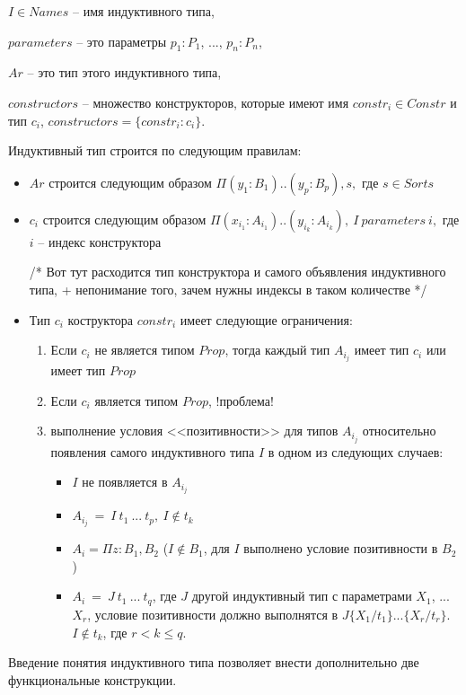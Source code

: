 \documentclass[12pt]{article}
\begin{document}
$I \in Names$ -- имя индуктивного типа,

$parameters$ -- это параметры $p_1:P_1$, ..., $p_n:P_n$,

$Ar$ -- это тип этого индуктивного типа,

$constructors$ -- множество конструкторов, 
которые имеют имя $constr_i \in Constr$ и тип $c_i$,
$constructors = \{constr_i: c_i\}$.

Индуктивный тип строится по следующим правилам:
\begin{itemize}
    \item $Ar$ строится следующим образом
$\Pi(y_1 : B_1)..(y_p : B_p),s,$ где $s \in Sorts$
    \item $c_i$ строится следующим образом
$\Pi(x_i_1 : A_i_1)..(y_i_k : A_i_k),\ I\ parameters\ i,$
где $i$ -- индекс конструктора

/* Вот тут расходится тип конструктора 
и самого объявления индуктивного типа, + непонимание того, зачем нужны индексы в таком количестве */
    \item Тип $c_i$ коструктора $constr_i$ имеет следующие ограничения:
    \begin{enumerate}
        \item Если $c_i$ не является типом $Prop$, 
тогда каждый тип $A_i_j$ имеет тип $c_i$ или имеет тип $Prop$
        \item Если $c_i$ является типом $Prop$,
!проблема!
        \item выполнение условия <<позитивности>> для типов $A_i_j$ 
относительно появления самого индуктивного типа $I$
в одном из следующих случаев:
        \begin{itemize}
            \item $I$ не появляется в $A_i_j$ 
            \item $A_i_j\ =\ I\ t_1\ ...\ t_p,\ I \notin t_k$
            \item $A_i = \Pi z:B_1, B_2$ ($I \notin B_1$, для $I$ выполнено условие позитивности в $B_2$)
            \item $A_i\ =\ J\ t_1\ ...\ t_q$, где $J$ другой индуктивный тип с параметрами $X_1$, ... $X_r$, 
            условие позитивности должно выполнятся
            в $J\{X_1/t_1\}...\{X_r/t_r\}$. $I \notin t_k$, где $r < k \leq q$.
        \end{itemize}
    \end{enumerate}
\end{itemize}


Введение понятия индуктивного типа позволяет 
внести дополнительно две функциональные конструкции.
\end{document}
